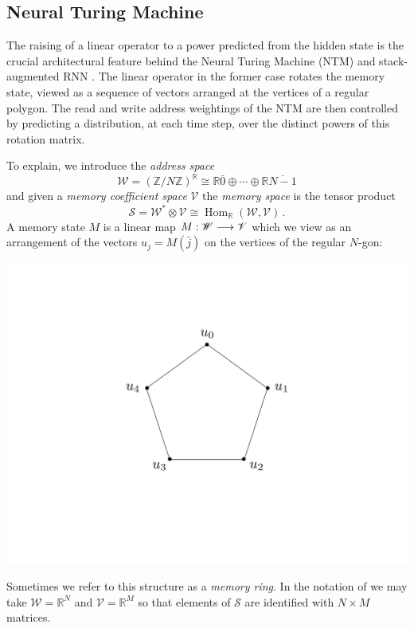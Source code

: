 \documentclass[english,letter paper,12pt,leqno]{article}
\theoremstyle{example}
\numberwithin{equation}{section}
\def\Hom{\operatorname{Hom}}
\begin{document}
\subsection{Neural Turing Machine}\label{example:ntm}

The raising of a linear operator to a power predicted from the hidden state is the crucial architectural feature behind the Neural Turing Machine (NTM) \cite{ntm} and stack-augmented RNN \cite{joulin}. The linear operator in the former case rotates the memory state, viewed as a sequence of vectors arranged at the vertices of a regular polygon. The read and write address weightings of the NTM are then controlled by predicting a distribution, at each time step, over the distinct powers of this rotation matrix. 

To explain, we introduce the \emph{address space}
\[
\mathscr{W} = (\mathbb{Z}/N\mathbb{Z})^{\mathbb{R}} \cong \mathbb{R} \bar{0} \oplus \cdots \oplus \mathbb{R} \overline{N-1}
\]
and given a \emph{memory coefficient space} $\mathscr{V}$ the \emph{memory space} is the tensor product
\[
\mathscr{S} = \mathscr{W}^* \otimes \mathscr{V} \cong \Hom_{\mathbb{R}}(\mathscr{W}, \mathscr{V})\,.
\]
A memory state $M$ is a linear map $M: \mathscr{W} \longrightarrow \mathscr{V}$ which we view as an arrangement of the vectors $u_j = M(\bar{j})$ on the vertices of the regular $N$-gon:
\begin{center}
\includegraphics[scale=0.3]{dia1}
\end{center}
Sometimes we refer to this structure as a \emph{memory ring}. In the notation of \cite{ntm} we may take $\mathscr{W} = \mathbb{R}^N$ and $\mathscr{V} = \mathbb{R}^M$ so that elements of $\mathscr{S}$ are identified with $N \times M$ matrices. 
\end{document}
